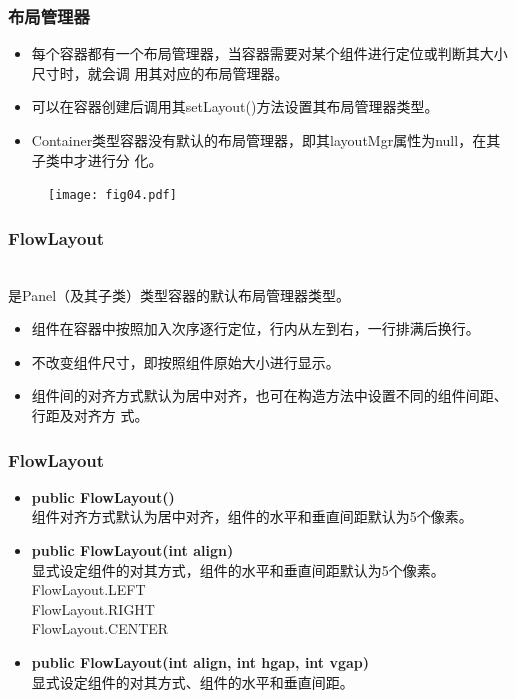 \begin{frame}[fragile] %
  \frametitle{布局管理器}
  \begin{itemize}
  \item 每个容器都有一个布局管理器，当容器需要对某个组件进行定位或判断其大小尺寸时，就会调
    用其对应的布局管理器。
  \item 可以在容器创建后调用其setLayout()方法设置其布局管理器类型。
  \item Container类型容器没有默认的布局管理器，即其layoutMgr属性为null，在其子类中才进行分
    化。
  \end{itemize}
  \begin{figure}
    \centering
    \texttt{[image: fig04.pdf]}
  \end{figure}
\end{frame}

\begin{frame}[fragile] %
  \frametitle{FlowLayout}

   \\是Panel（及其子类）类型容器的默认布局管理器类型。

  \begin{itemize}\kai
  \item 组件在容器中按照加入次序逐行定位，行内从左到右，一行排满后换行。
  \item 不改变组件尺寸，即按照组件原始大小进行显示。
  \item 组件间的对齐方式默认为居中对齐，也可在构造方法中设置不同的组件间距、行距及对齐方
    式。
  \end{itemize}
\end{frame}

\begin{frame}[fragile] %
  \frametitle{FlowLayout}
  
  \begin{itemize}\kai
  \item {\bf public FlowLayout()}\\
    组件对齐方式默认为居中对齐，组件的水平和垂直间距默认为5个像素。

  \item {\bf public FlowLayout(int align)}\\
    显式设定组件的对其方式，组件的水平和垂直间距默认为5个像素。\\
    FlowLayout.LEFT \\
    FlowLayout.RIGHT\\
    FlowLayout.CENTER\\

  \item {\bf public FlowLayout(int align, int hgap, int vgap)}\\
    显式设定组件的对其方式、组件的水平和垂直间距。
  \end{itemize}


\end{frame}


